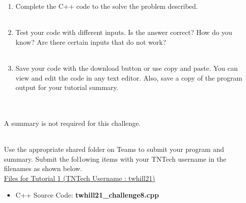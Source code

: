 \documentclass[12pt]{article}
\begin{document}
\begin{description}[labelindent=1cm]
\begin{enumerate}
		\item Complete the C++ code to the solve the problem described. \\\\
		
		\item Test your code with different inputs. Is the answer correct? How do you know? Are there certain inputs that do not work? \\\\
		
	
		\item Save your code with the download button or use copy and paste. You can view and edit the code in any text editor. Also, save a copy of the program output for your tutorial summary. \\\\

	\end{enumerate}

\newpage
\item[\textbf{\underline{Solution Code:}}] \hfill \vspace{0mm}
%
%
%
%

\newpage
\item[\textbf{\underline{Tutorial Summary:}}] \hfill \vspace{3mm}\\ 

A summary is not required for this challenge.

\item[\textbf{\underline{Submission on Teams:}}] \hfill \vspace{3mm}\\ 
Use the appropriate shared folder on Teams to submit your program and summary. Submit the fol1owing items with your TNTech username in the filenames as shown below. \vspace{0mm}\\

\underline{Files for Tutorial 1 (TNTech Username : twhill21)}

\begin{itemize}


\item C++ Source Code: \textbf{ twhill21\_challenge8.cpp}

\end{itemize}


\end{description}
\end{document}
